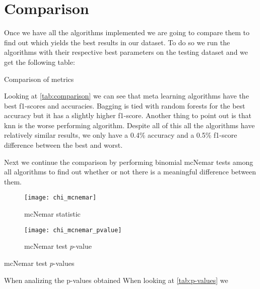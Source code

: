 
\section{Comparison}%
\label{sec:comparison}


Once we have all the algorithms implemented we are going to compare them to find out which yields the best results in our dataset. To do so we run the algorithms with their respective best parameters on the testing dataset and we get the following table:

\begin{table}[H]
\centering
\caption{Comparison of metrics}%
\label{tab:comparison}

\end{table}

Looking at \cref{tab:comparison} we can see that meta learning algorithms have the best f1-scores and accuracies. Bagging is tied with random forests for the best accuracy but it has a slightly higher f1-score. Another thing to point out is that knn is the worse performing algorithm. Despite all of this all the algorithms have relatively similar results, we only have a 0.4\% accuracy and a 0.5\% f1-score difference between the best and worst. 

Next we continue the comparison by performing binomial mcNemar tests among all algorithms to find out whether or not there is a meaningful difference between them.

\begin{figure}[H]
\centering
\texttt{[image: chi\_mcnemar]}
\caption{mcNemar statistic}
\end{figure}

\begin{figure}[H]
\centering
\texttt{[image: chi\_mcnemar\_pvalue]}
\caption{mcNemar test $p$-value}
\end{figure}

\begin{table}[H]
\centering
\caption{mcNemar test $p$-values}
\label{tab:p-values}

\end{table}

When analizing the p-values obtained 
When looking at \cref{tab:p-values} we 